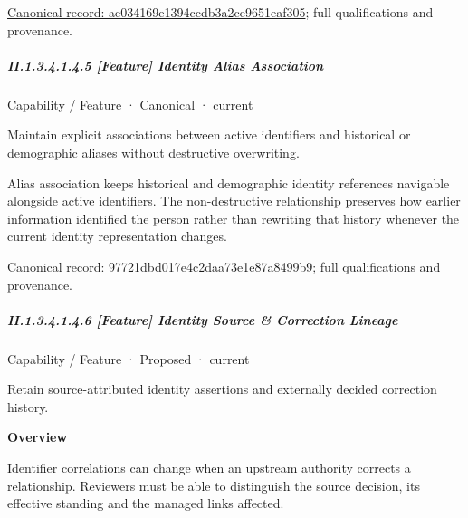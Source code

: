 {\footnotesize \href{../../../../continuum/strategy/capability/feature/ae034169e1394ccdb3a2ce9651eaf305.md}{Canonical record: ae034169e1394ccdb3a2ce9651eaf305}; full qualifications and provenance.}\par
\subparagraph*{II.1.3.4.1.4.5 [Feature] Identity Alias Association}
\label{navigation:II.1.3.4.1.4.5}

\label{element:97721dbd017e4c2daa73e1e87a8499b9}
{\small Capability / Feature · Canonical · current}\par

Maintain explicit associations between active identifiers and historical or demographic aliases without destructive overwriting.



Alias association keeps historical and demographic identity references navigable alongside active identifiers. The non-destructive relationship preserves how earlier information identified the person rather than rewriting that history whenever the current identity representation changes.


{\footnotesize \href{../../../../continuum/strategy/capability/feature/97721dbd017e4c2daa73e1e87a8499b9.md}{Canonical record: 97721dbd017e4c2daa73e1e87a8499b9}; full qualifications and provenance.}\par
\subparagraph*{II.1.3.4.1.4.6 [Feature] Identity Source \& Correction Lineage}
\label{navigation:II.1.3.4.1.4.6}

\label{element:d72134e75001449a9e7ffae53f61458f}
{\small Capability / Feature · Proposed · current}\par

Retain source-attributed identity assertions and externally decided correction history.



\textbf{Overview}



Identifier correlations can change when an upstream authority corrects a relationship. Reviewers must be able to distinguish the source decision, its effective standing and the managed links affected.



